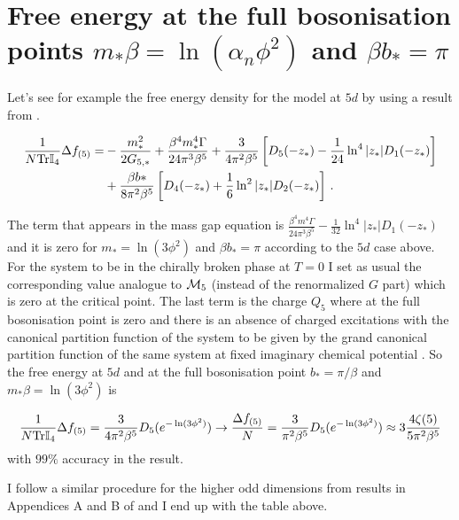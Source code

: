 \documentclass[twoside]{article}
\begin{document}
\section{Free energy at the full bosonisation points $m_*\beta=\ln(\alpha_n\phi^2)$ and $\beta b_*=\pi$}

Let's see for example the free energy density for the model at $5d$ by using a result from \cite{Filothodoros:2018}.

\begin{align}
\label{GNfe5}
\frac{1}{N{\rm Tr}{\mathbb I}_{4}}\Delta f_{(5)} =&-\frac{m_*^2}{2G_{5,*}}+\frac{\beta^4 m_*^4\Gamma}{24\pi^3 \beta^5}+\frac{3}{4\pi^2\beta^5}\left[D_5(-z_*)-\frac{1}{24}\ln^4|z_*|D_1(-z_*)\right]\nonumber\\
&+\frac{\beta b*}{8\pi^2\beta^5}\left[D_4(-z_*)+\frac{1}{6}\ln^2|z_*|D_2(-z_*)\right]\,.
\end{align}

The term that appears in the mass gap equation is $\frac{\beta^4 m^4\Gamma}{24\pi^3 \beta^5}-\frac{1}{32}\ln^4|z_*|D_1(-z_*)$ and it is zero for $m_*=\ln(3\phi^2)$ and $\beta b_*=\pi$ according to the $5d$ case above. For the system to be in the chirally broken phase at $T=0$ I set as usual the corresponding value analogue to ${\cal M}_5$ (instead of the renormalized $G$ part) which is zero at the critical point. The last term is the charge $Q_5$ where at the full bosonisation point is zero and there is an absence of charged excitations with the canonical partition function of the system to be given by the grand canonical partition function of the same system at fixed imaginary chemical potential \cite{Filothodoros:2016txa}. So the free energy at $5d$ and at the full bosonisation point $b_*=\pi/\beta$ and $m_*\beta=\ln(3\phi^2)$ is 

\begin{equation}
\frac{1}{N{\rm Tr}{\mathbb I}_{4}}\Delta f_{(5)}=\frac{3}{4\pi^2\beta^5}D_5(e^{-\ln(3\phi^2)})\rightarrow \frac{\Delta f_{(5)}}{N}=\frac{3}{{\pi^2\beta^5}}D_5(e^{-\ln(3\phi^2)})\approx 3\frac{4\zeta(5)}{5\pi^2\beta^5}
\end{equation}
with $99\%$ accuracy in the result.

I follow a similar procedure for the higher odd dimensions from results in Appendices A and B of \cite{Filothodoros:2018} and I end up with the table above.
\end{document}
